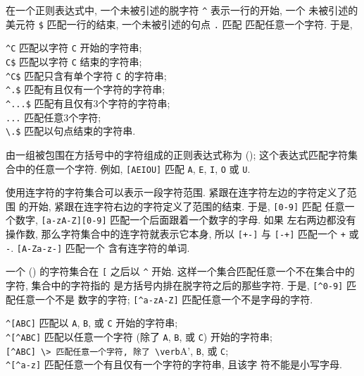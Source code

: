 在一个正则表达式中, 一个未被引述的脱字符 \verb'^' 表示一行的开始, 一个
未被引述的美元符 \verb'$' 匹配一行的结束, 一个未被引述的句点 \verb'.' 匹配
匹配任意一个字符. 于是,
\begin{tabbing}
    \verb'^C' \hspace{4em}  \= 匹配以字符 \verb'C' 开始的字符串; \\
    \verb'C$'   \> 匹配以字符 \verb'C' 结束的字符串; \\
    \verb'^C$'  \> 匹配只含有单个字符 \verb'C' 的字符串; \\
    \verb'^.$'  \> 匹配有且仅有一个字符的字符串; \\
    \verb'^...$' \> 匹配有且仅有3个字符的字符串; \\
    \verb'...'  \> 匹配任意3个字符; \\
    \verb'\.$'  \> 匹配以句点结束的字符串.
\end{tabbing}

由一组被包围在方括号中的字符组成的正则表达式称为 
(); 这个表达式匹配字符集合中的任意一个字符. 例如,
\verb'[AEIOU]' 匹配 \verb'A', \verb'E', \verb'I', \verb'O' 或 \verb'U'.

使用连字符的字符集合可以表示一段字符范围. 紧跟在连字符左边的字符定义了范围
的开始, 紧跟在连字符右边的字符定义了范围的结束. 于是, \verb'[0-9]' 匹配
任意一个数字, \verb'[a-zA-Z][0-9]' 匹配一个后面跟着一个数字的字母. 如果
左右两边都没有操作数, 那么字符集合中的连字符就表示它本身, 所以 \verb'[+-]'
与 \verb'[-+]' 匹配一个 \verb'+' 或 \verb'-'. \verb'[A-Za-z-]' 匹配一个
含有连字符的单词.

一个  () 的字符集合在 \verb'[' 之后以
\verb'^' 开始. 这样一个集合匹配任意一个不在集合中的字符, 集合中的字符指的
是方括号内排在脱字符之后的那些字符. 于是, \verb'[^0-9]' 匹配任意一个不是
数字的字符; \verb'[^a-zA-Z]' 匹配任意一个不是字母的字符.
\begin{tabbing}
    \verb'^[ABC]' \hspace{4em}  \= 匹配以 \verb'A', \verb'B', 或 \verb'C'
        开始的字符串; \\
    \verb'^[^ABC]' \> 匹配以任意一个字符 (除了 \verb'A', \verb'B',
        或 \verb'C') 开始的字符串; \\
    \verb'[^ABC] \> 匹配任意一个字符, 除了 \verb'A', \verb'B', 或
        \verb'C'; \\
    \verb'^[^a-z]' \> 匹配任意一个有且仅有一个字符的字符串, 且该字
        符不能是小写字母.
\end{tabbing}


